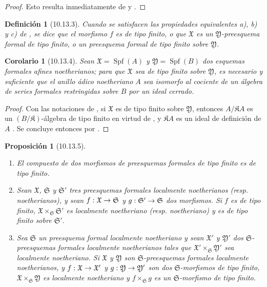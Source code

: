 \documentclass[oneside]{amsart}
\theoremstyle{ega-env-style}
\theoremstyle{ega-thm-env-style}
\newtheorem*{proposition}{Proposición}
\newtheorem*{corollary}{Corolario}
\theoremstyle{ega-defn-env-style}
\newtheorem*{definition}{Definición}
\renewcommand{\to}{\mathchoice{\longrightarrow}{\rightarrow}{\rightarrow}{\rightarrow}}
\newcommand{\oldpage}[2][]{{\marginnote{\normalfont{\textbf{#1}~|~#2}}}\ignorespaces}
\let\EGAOriginalLabel\label
\renewcommand{\label}[1]{\phantomsection\EGAOriginalLabel{#1}}
\begin{document}
\begin{proof}
Esto resulta inmediatamente de  y .
\end{proof}

\begin{definition}[10.13.3]
\label{I.10.13.3}
{\itshape Cuando se satisfacen las propiedades equivalentes \textup{a), b) y c)} de , se dice que el morfismo $f$ es de tipo finito, o que $\mathfrak{X}$ es un $\mathfrak{Y}$-preesquema formal de tipo finito, o un preesquema formal de tipo finito sobre $\mathfrak{Y}$.}
\end{definition}

\begin{corollary}[10.13.4]
\label{I.10.13.4}
Sean $\mathfrak{X}=\operatorname{Spf}(A)$ y $\mathfrak{Y}=\operatorname{Spf}(B)$ dos esquemas formales afines noetherianos;
para que $\mathfrak{X}$ sea de tipo finito sobre $\mathfrak{Y}$, es necesario y suficiente que el anillo ádico noetheriano $A$ sea isomorfo al cociente de un álgebra de series formales restringidas sobre $B$ por un ideal cerrado.
\end{corollary}

\begin{proof}
Con las notaciones de , si $\mathfrak{X}$ es de tipo finito sobre $\mathfrak{Y}$, entonces $A/\mathfrak{K}A$ es un $(B/\mathfrak{K})$-álgebra de tipo finito en virtud de , y $\mathfrak{K}A$ es un ideal de definición de $A$ .
Se concluye entonces por .
\end{proof}

\begin{proposition}[10.13.5]
\label{I.10.13.5}
\medskip\noindent
\begin{enumerate}
  \item[\rm{(i)}] El compuesto de dos morfismos de preesquemas formales de tipo finito es de tipo finito.
\oldpage[I]{209}
  \item[\rm{(ii)}] Sean $\mathfrak{X}$, $\mathfrak{S}$ y $\mathfrak{S}'$ tres preesquemas formales localmente noetherianos \textup{(resp.} noetherianos\textup{)}, y sean $f:\mathfrak{X}\to\mathfrak{S}$ y $g:\mathfrak{S}'\to\mathfrak{S}$ dos morfismos.
    Si $f$ es de tipo finito, $\mathfrak{X}\times_{\mathfrak{S}}\mathfrak{S}'$ es localmente noetheriano \textup{(resp.} noetheriano\textup{)} y es de tipo finito sobre $\mathfrak{S}'$.
  \item[\rm{(iii)}] Sea $\mathfrak{S}$ un preesquema formal localmente noetheriano y sean $\mathfrak{X}'$ y $\mathfrak{Y}'$ dos $\mathfrak{S}$-preesquemas formales localmente noetherianos tales que $\mathfrak{X}'\times_{\mathfrak{S}}\mathfrak{Y}'$ sea localmente noetheriano.
    Si $\mathfrak{X}$ y $\mathfrak{Y}$ son $\mathfrak{S}$-preesquemas formales localmente noetherianos, y $f:\mathfrak{X}\to\mathfrak{X}'$ y $g:\mathfrak{Y}\to\mathfrak{Y}'$ son dos $\mathfrak{S}$-morfismos de tipo finito, $\mathfrak{X}\times_{\mathfrak{S}}\mathfrak{Y}$ es localmente noetheriano y $f\times_{\mathfrak{S}}g$ es un $\mathfrak{S}$-morfismo de tipo finito.
\end{enumerate}
\end{proposition}
\end{document}
